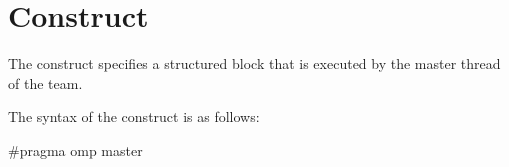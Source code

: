 %
%
%
%
%
%
%
%
%
%
%
%
%

\section{ Construct}
\label{sec:master}
\summary
The  construct specifies a structured block that is executed by the master thread
of the team.

\syntax
\begin{ccppspecific}
The syntax of the  construct is as follows:

\begin{ompcPragma}
#pragma omp master 
\end{ompcPragma}
\end{ccppspecific}

